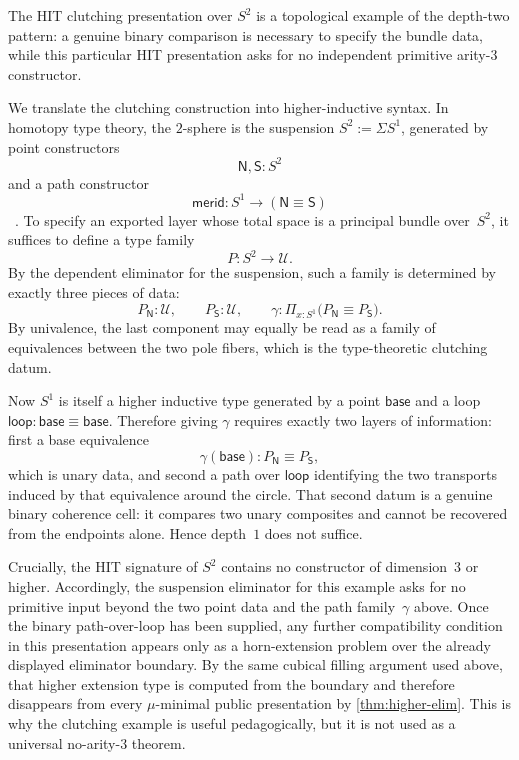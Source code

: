 \documentclass{lmcs}
\newcommand{\U}{\mathcal{U}}
\begin{document}
\begin{rem}
\label{thm:clutching}
The HIT clutching presentation over $S^2$ is a topological example of the depth-two pattern: a genuine binary comparison is necessary to specify the bundle data, while this particular HIT presentation asks for no independent primitive arity-$3$ constructor.

We translate the clutching construction into higher-inductive syntax. In homotopy type theory, the $2$-sphere is the suspension $S^2 := \Sigma S^1$, generated by point constructors
\[
  \mathsf{N}, \mathsf{S} : S^2
\]
and a path constructor
\[
  \mathsf{merid} : S^1 \to (\mathsf{N} \equiv \mathsf{S})
\]
~\cite{hott,cchm-hits}. To specify an exported layer whose total space is a principal bundle over~$S^2$, it suffices to define a type family
\[
  P : S^2 \to \U.
\]
By the dependent eliminator for the suspension, such a family is determined by exactly three pieces of data:
\[
  P_{\mathsf{N}} : \U,
  \qquad
  P_{\mathsf{S}} : \U,
  \qquad
  \gamma : \Pi_{x:S^1} \bigl(P_{\mathsf{N}} \equiv P_{\mathsf{S}}\bigr).
\]
By univalence, the last component may equally be read as a family of equivalences between the two pole fibers, which is the type-theoretic clutching datum.

Now $S^1$ is itself a higher inductive type generated by a point $\mathsf{base}$ and a loop $\mathsf{loop} : \mathsf{base} \equiv \mathsf{base}$. Therefore giving $\gamma$ requires exactly two layers of information: first a base equivalence
\[
  \gamma(\mathsf{base}) : P_{\mathsf{N}} \equiv P_{\mathsf{S}},
\]
which is unary data, and second a path over $\mathsf{loop}$ identifying the two transports induced by that equivalence around the circle. That second datum is a genuine binary coherence cell: it compares two unary composites and cannot be recovered from the endpoints alone. Hence depth~$1$ does not suffice.

Crucially, the HIT signature of $S^2$ contains no constructor of dimension~$3$ or higher. Accordingly, the suspension eliminator for this example asks for no primitive input beyond the two point data and the path family~$\gamma$ above. Once the binary path-over-loop has been supplied, any further compatibility condition in this presentation appears only as a horn-extension problem over the already displayed eliminator boundary. By the same cubical filling argument used above, that higher extension type is computed from the boundary and therefore disappears from every $\mu$-minimal public presentation by \autoref{thm:higher-elim}. This is why the clutching example is useful pedagogically, but it is not used as a universal no-arity-$3$ theorem.
\end{rem}
\end{document}
